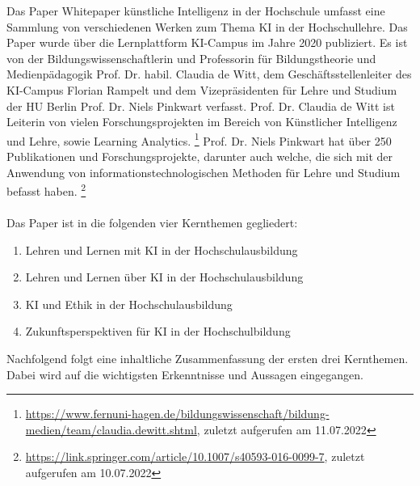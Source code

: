 
Das Paper \glqq{}Whitepaper künstliche Intelligenz in der Hochschule\grqq{} umfasst eine Sammlung von verschiedenen Werken zum Thema \ac{KI} in der Hochschullehre. Das Paper wurde über die Lernplattform KI-Campus im Jahre 2020 publiziert. Es ist von der Bildungswissenschaftlerin und Professorin für Bildungstheorie und Medienpädagogik Prof. Dr. habil. Claudia de Witt, dem Geschäftsstellenleiter des KI-Campus Florian Rampelt und dem Vizepräsidenten für Lehre und Studium der HU Berlin Prof. Dr. Niels Pinkwart verfasst. Prof. Dr. Claudia de Witt ist Leiterin von vielen Forschungsprojekten im Bereich von Künstlicher Intelligenz und Lehre, sowie Learning Analytics. \footnote{\url{https://www.fernuni-hagen.de/bildungswissenschaft/bildung-medien/team/claudia.dewitt.shtml}, zuletzt aufgerufen am 11.07.2022} Prof. Dr. Niels Pinkwart hat über 250 Publikationen und Forschungsprojekte, darunter auch welche, die sich mit der Anwendung von informationstechnologischen Methoden für Lehre und Studium befasst haben. \footnote{\url{https://link.springer.com/article/10.1007/s40593-016-0099-7}, zuletzt aufgerufen am
      10.07.2022}
\\ \\ \noindent
Das Paper ist in die folgenden vier Kernthemen gegliedert:
\begin{enumerate}
      \item Lehren und Lernen mit KI in der Hochschulausbildung
      \item Lehren und Lernen über KI in der Hochschulausbildung
      \item KI und Ethik in der Hochschulausbildung
      \item Zukunftsperspektiven für KI in der Hochschulbildung
\end{enumerate}
\noindent
Nachfolgend folgt eine inhaltliche Zusammenfassung der ersten drei Kernthemen. Dabei wird auf die wichtigsten Erkenntnisse und Aussagen eingegangen.

